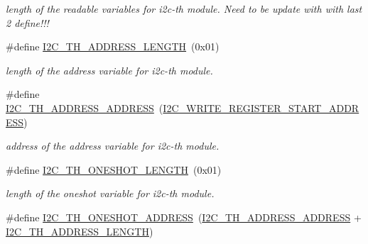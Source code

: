\begin{DoxyCompactItemize}
\begin{DoxyCompactList}\small\item\em length of the readable variables for i2c-\/th module. Need to be update with with last 2 define!!! \end{DoxyCompactList}\item 
\mbox{\label{registers-th_8h_a1e4b6908ce39429faf90260a43e7ec37}} 
\#define \hyperlink{registers-th_8h_a1e4b6908ce39429faf90260a43e7ec37}{I2\+C\+\_\+\+T\+H\+\_\+\+A\+D\+D\+R\+E\+S\+S\+\_\+\+L\+E\+N\+G\+TH}~(0x01)
\begin{DoxyCompactList}\small\item\em length of the address variable for i2c-\/th module. \end{DoxyCompactList}\item 
\mbox{\label{registers-th_8h_a6df2cc51e362af945f405c7d301327be}} 
\#define \hyperlink{registers-th_8h_a6df2cc51e362af945f405c7d301327be}{I2\+C\+\_\+\+T\+H\+\_\+\+A\+D\+D\+R\+E\+S\+S\+\_\+\+A\+D\+D\+R\+E\+SS}~(\hyperlink{registers_8h_ad980dee82f83659f0a84e3e1f3c177bb}{I2\+C\+\_\+\+W\+R\+I\+T\+E\+\_\+\+R\+E\+G\+I\+S\+T\+E\+R\+\_\+\+S\+T\+A\+R\+T\+\_\+\+A\+D\+D\+R\+E\+SS})
\begin{DoxyCompactList}\small\item\em address of the address variable for i2c-\/th module. \end{DoxyCompactList}\item 
\mbox{\label{registers-th_8h_a38df5cc5dfe2b225095688c18642605b}} 
\#define \hyperlink{registers-th_8h_a38df5cc5dfe2b225095688c18642605b}{I2\+C\+\_\+\+T\+H\+\_\+\+O\+N\+E\+S\+H\+O\+T\+\_\+\+L\+E\+N\+G\+TH}~(0x01)
\begin{DoxyCompactList}\small\item\em length of the oneshot variable for i2c-\/th module. \end{DoxyCompactList}\item 
\mbox{\label{registers-th_8h_ad4150157cb88a802b002ec84ebcc1706}} 
\#define \hyperlink{registers-th_8h_ad4150157cb88a802b002ec84ebcc1706}{I2\+C\+\_\+\+T\+H\+\_\+\+O\+N\+E\+S\+H\+O\+T\+\_\+\+A\+D\+D\+R\+E\+SS}~(\hyperlink{registers-th_8h_a6df2cc51e362af945f405c7d301327be}{I2\+C\+\_\+\+T\+H\+\_\+\+A\+D\+D\+R\+E\+S\+S\+\_\+\+A\+D\+D\+R\+E\+SS} + \hyperlink{registers-th_8h_a1e4b6908ce39429faf90260a43e7ec37}{I2\+C\+\_\+\+T\+H\+\_\+\+A\+D\+D\+R\+E\+S\+S\+\_\+\+L\+E\+N\+G\+TH})

\end{DoxyCompactItemize}
